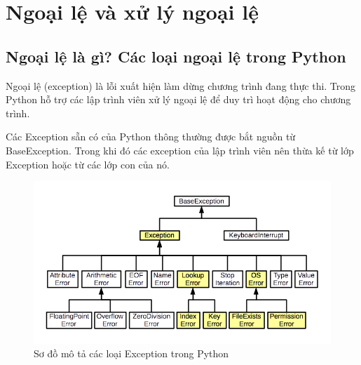 \section{Ngoại lệ và xử lý ngoại lệ}
\label{exception}
\subsection{Ngoại lệ là gì? Các loại ngoại lệ trong Python}
Ngoại lệ (exception) là lỗi xuất hiện làm dừng chương trình đang thực thi. Trong Python hỗ trợ các lập trình viên xử lý ngoại lệ để duy trì hoạt động cho chương trình.\par
Các Exception sẵn có của Python thông thường được bắt nguồn từ BaseException. Trong khi đó các exception của lập trình viên nên thừa kế từ lớp Exception hoặc từ các lớp con của nó. 
\begin{figure}[h]
	\centering
	\includegraphics[width=0.7\linewidth]{img/exception}
	\caption{Sơ đồ mô tả các loại Exception trong Python}
\end{figure}
\newpage
